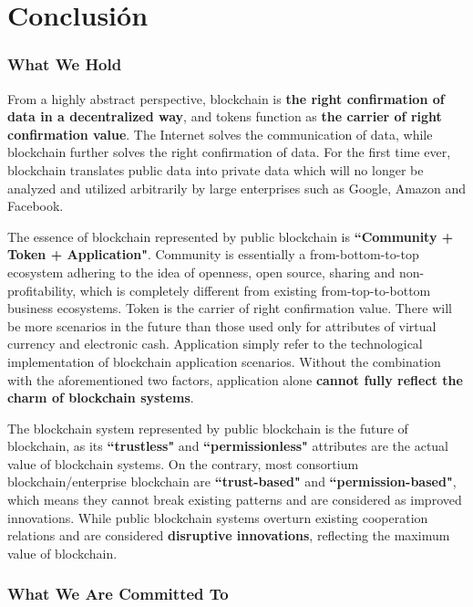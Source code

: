 \section{Conclusión}
\label{sec:conclusion}

\subsubsection*{What We Hold}

From a highly abstract perspective, blockchain is \textbf{the right confirmation of data in a decentralized way}, and tokens function as \textbf{the carrier of right confirmation value}. The Internet solves the communication of data, while blockchain further solves the right confirmation of data. For the first time ever, blockchain translates public data into private data which will no longer be analyzed and utilized arbitrarily by large enterprises such as Google, Amazon and Facebook.

The essence of blockchain represented by public blockchain is \textbf{``Community + Token + Application"}. Community is essentially a from-bottom-to-top ecosystem adhering to the idea of openness, open source, sharing and non-profitability, which is completely different from existing from-top-to-bottom business ecosystems. Token is the carrier of right confirmation value. There will be more scenarios in the future than those used only for attributes of virtual currency and electronic cash. Application simply refer to the technological implementation of blockchain application scenarios. Without the combination with the aforementioned two factors, application alone \textbf{cannot fully reflect the charm of blockchain systems}.

The blockchain system represented by public blockchain is the future of blockchain, as its \textbf{``trustless"} and \textbf{``permissionless"} attributes are the actual value of blockchain systems. On the contrary, most consortium blockchain/enterprise blockchain are \textbf{``trust-based"} and \textbf{``permission-based"}, which means they cannot break existing patterns and are considered as improved innovations. While public blockchain systems overturn existing cooperation relations and are considered \textbf{disruptive innovations}, reflecting the maximum value of blockchain.

\subsubsection*{What We Are Committed To}

